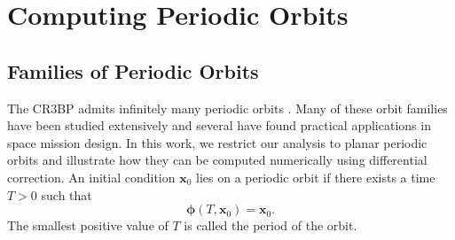 \section{Computing Periodic Orbits} 
\label{sec:ComputingPeriodicOrbits}

\subsection{Families of Periodic Orbits}
The CR3BP admits infinitely many periodic orbits \cite{Poincare_1893}.
Many of these orbit families have been studied extensively and several have found practical applications in space mission design. 
In this work, we restrict our analysis to planar periodic orbits and illustrate how they can be computed numerically using differential correction. 
An initial condition $\boldsymbol{x}_0$ lies on a periodic orbit if there exists a time $T>0$ such that
\begin{equation*}
    \boldsymbol{\phi}(T,\boldsymbol{x}_0) =\boldsymbol{x}_0.
\end{equation*}
The smallest positive value of $T$ is called the period of the orbit.

